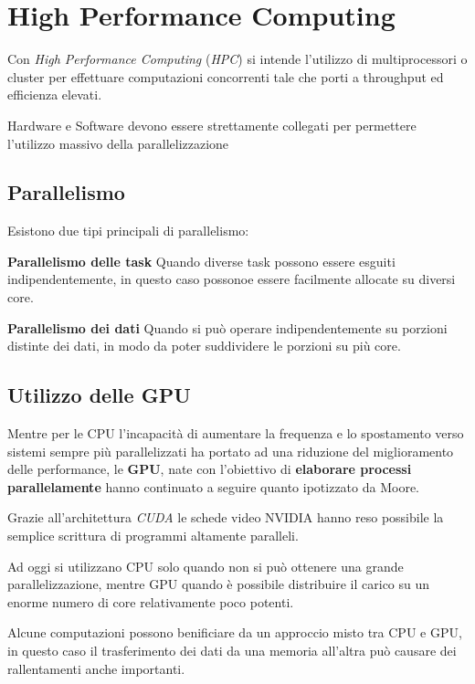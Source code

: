 \section{High Performance Computing}
Con \textit{High Performance Computing} (\textit{HPC}) si intende l'utilizzo di multiprocessori o cluster per effettuare computazioni concorrenti tale che porti a throughput ed efficienza elevati.

Hardware e Software devono essere strettamente collegati per permettere l'utilizzo massivo della parallelizzazione

\subsection{Parallelismo}
Esistono due tipi principali di parallelismo:
\begin{sitemize}
    \item \textbf{Parallelismo delle task} Quando diverse task possono essere esguiti indipendentemente, in questo caso possonoe essere facilmente allocate su diversi core.
    \item \textbf{Parallelismo dei dati} Quando si può operare indipendentemente su porzioni distinte dei dati, in modo da poter suddividere le porzioni su più core.
\end{sitemize}

\subsection{Utilizzo delle GPU}
Mentre per le CPU l'incapacità di aumentare la frequenza e lo spostamento verso sistemi sempre più parallelizzati ha portato ad una riduzione del miglioramento delle performance, le \textbf{GPU}, nate con l'obiettivo di \textbf{elaborare processi parallelamente} hanno continuato a seguire quanto ipotizzato da Moore.

\spacer
Grazie all'architettura \textit{CUDA} le schede video NVIDIA hanno reso possibile la semplice scrittura di programmi altamente paralleli.

Ad oggi si utilizzano CPU solo quando non si può ottenere una grande parallelizzazione, mentre GPU quando è possibile distribuire il carico su un enorme numero di core relativamente poco potenti.

\spacer
Alcune computazioni possono benificiare da un approccio misto tra CPU e GPU, in questo caso il trasferimento dei dati da una memoria all'altra può causare dei rallentamenti anche importanti.

